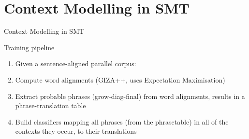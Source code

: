 \documentclass[compress]{beamer}
\begin{document}
\section{Context Modelling in SMT}
\begin{frame}{Context Modelling in SMT}

  \begin{block}{Training pipeline}
    \begin{enumerate}
      \item Given a sentence-aligned parallel corpus:
      \item Compute word alignments (GIZA++, uses Expectation Maximisation)
      \item Extract probable phrases (grow-diag-final) from word alignments,
        results in a phrase-translation table
      \item Build classifiers mapping all phrases (from the phrasetable) in all of
        the contexts they occur, to their translations
    \end{enumerate}
  \end{block}

\end{frame}
\end{document}
